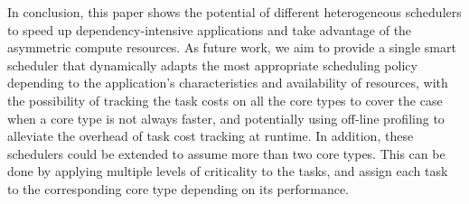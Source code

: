 
In conclusion, this paper shows the potential of different heterogeneous schedulers to speed up dependency-intensive applications and take advantage of the asymmetric compute resources.
As future work, we aim to provide a single smart scheduler that dynamically adapts the most appropriate scheduling policy depending to the application's characteristics and availability of resources, with the possibility of tracking the task costs on all the core types to cover the case when a core type is not always faster, and potentially using off-line profiling to alleviate the overhead of task cost tracking at runtime. 
In addition, these schedulers could be extended to assume more than two core types. This can be done by applying multiple levels of criticality to the tasks, and assign each task to the corresponding core type depending on its performance.



